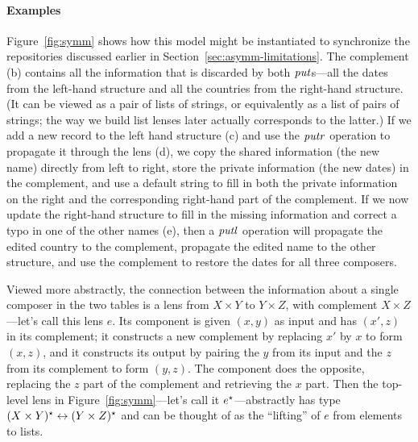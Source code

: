 
\paragraph*{Examples} Figure~\ref{fig:symm} shows how this model might be
instantiated to synchronize the repositories discussed earlier in
Section~\ref{sec:asymm-limitations}.
%
The complement (b) contains all the information that is discarded by both
$\mathit{put}$s---all the dates from the left-hand structure and all the countries
from the right-hand structure.  (It can be viewed as a pair of lists of
strings, or equivalently as a list of pairs of strings; the way we build
list lenses later actually corresponds to the latter.)  If we add a
new record to the left hand structure (c) and use the $\mathit{putr}$ operation to
propagate it through the lens (d), we copy the shared information (the new
name) directly from left to right, store the private information (the new
dates) in the complement, and use a default string to fill in both the
private information on the right and the corresponding right-hand part of
the complement.  If we now update the right-hand structure to fill in the
missing information and correct a typo in one of the other names
(e), then a $\mathit{putl}$ operation will propagate the edited country to the
complement, propagate the edited name to the other structure, and use the
complement to restore the dates for all three composers.

Viewed more abstractly, the
connection between the information about a single composer in the two tables
is a lens from $X \times Y$ to $Y \times Z$, with complement $X
\times Z$---let's call this lens $e$.  Its \PUTR{} component is given $(x,y)$ as
input and has $(x',z)$ in its complement; it constructs a new complement by
replacing $x'$ by $x$ to form $(x,z)$, and it constructs its output by
pairing the $y$ from its input and the $z$ from its complement to form
$(y,z)$. The \PUTL{} component does the opposite, replacing the $z$ part of
the complement and retrieving the $x$ part.  Then the
top-level lens in Figure~\ref{fig:symm}---let's call it
$e^\star$---abstractly has type $(X \times Y)^\star \leftrightarrow (Y \times Z)^\star$
and can be thought of as the ``lifting'' of $e$ from elements
to lists.

